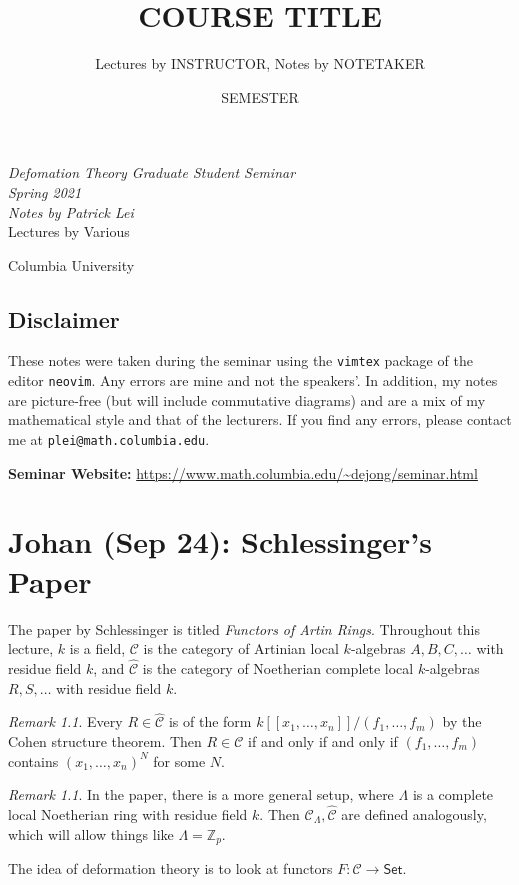 \documentclass[leqno, openany]{memoir}
\title{COURSE TITLE}
\author{Lectures by INSTRUCTOR, Notes by NOTETAKER}
\date{SEMESTER}
\theoremstyle{definition}
\theoremstyle{remark}
\newtheorem{rmk}[thm]{Remark}
\theoremstyle{plain}
\theoremstyle{definition}
\theoremstyle{remark}
\newcommand{\Z}{\mathbb{Z}}
\newcommand{\mc}[1]{\mathcal{#1}}
\newcommand{\ms}[1]{\mathsf{#1}}
\newcommand{\wh}[1]{\widehat{#1}}
\newcommand*{\titleSW}
    {\begingroup%
    \raggedleft
    \vspace*{\baselineskip}
    {\Huge\itshape Defomation Theory Graduate Student Seminar \\ Spring 2021}\\[\baselineskip]
    {\large\itshape Notes by Patrick Lei}\\[0.2\textheight]
    {\Large Lectures by Various}\par
    \vfill
    {\Large \sffamily Columbia University}
    \vspace*{\baselineskip}
\endgroup}
\begin{document}
    
\begin{titlingpage}
\titleSW
\end{titlingpage}

\thispagestyle{empty}
\section*{Disclaimer}%
\label{sec:disclaimer}

These notes were taken during the seminar using the \texttt{vimtex} package of the editor \texttt{neovim}. 
Any errors are mine and not the speakers'. 
In addition, my notes are picture-free (but will include commutative diagrams) and are a mix of my mathematical style and that of the lecturers.
If you find any errors, please contact me at \texttt{plei@math.columbia.edu}.

\vspace*{1cm}

\noindent\textbf{Seminar Website:}  \url{https://www.math.columbia.edu/~dejong/seminar.html}
\newpage

\tableofcontents

\chapter{Johan (Sep 24): Schlessinger's Paper}%
\label{cha:johan_sep_24_schlessinger_s_paper}

The paper by Schlessinger is titled \textit{Functors of Artin Rings}. Throughout this lecture, $k$ is a field, $\mc{C}$ is the category of Artinian local $k$-algebras $A, B, C, \ldots$ with residue field $k$, and $\wh{\mc{C}}$ is the category of Noetherian complete local $k$-algebras $R, S, \ldots$ with residue field $k$.

\begin{rmk}
    Every $R \in \wh{\mc{C}}$ is of the form $k[[x_1, \ldots, x_n]] / (f_1, \ldots, f_m)$ by the Cohen structure theorem. Then $R \in \mc{C}$ if and only if and only if $(f_1, \ldots, f_m)$ contains ${(x_1, \ldots, x_n)}^N$ for some $N$.
\end{rmk}

\begin{rmk}
    In the paper, there is a more general setup, where $\Lambda$ is a complete local Noetherian ring with residue field $k$. Then $\mc{C}_{\Lambda}, \wh{\mc{C}}$ are defined analogously, which will allow things like $\Lambda = \Z_p$.
\end{rmk}

The idea of deformation theory is to look at functors $F \colon \mc{C} \to \ms{Set}$.
\end{document}
